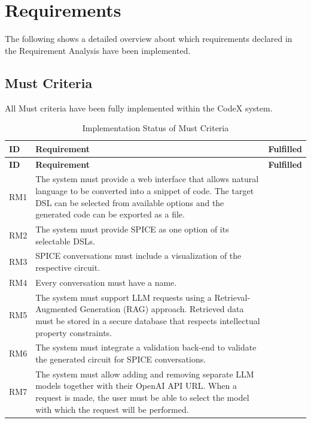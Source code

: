 \newcommand{\cmark}{\ding{51}}
\newcommand{\xmark}{\ding{55}}
\newcommand{\omark}{\ding{108}}
\chapter{Requirements}
The following shows a detailed overview about which requirements declared in the Requirement Analysis have been implemented.

\section{Must Criteria}
All Must criteria have been fully implemented within the CodeX system.

\begin{longtable}{p{1.2cm} p{11cm} p{1.5cm}}
\caption{Implementation Status of Must Criteria}
\label{tab:must-criteria} \\

\toprule
\textbf{ID} & \textbf{Requirement} & \textbf{Fulfilled} \\
\midrule
\endfirsthead

\toprule
\textbf{ID} & \textbf{Requirement} & \textbf{Fulfilled} \\
\midrule
\endhead

RM1 & The system must provide a web interface that allows natural language to be converted into a snippet of code. The target DSL can be selected from available options and the generated code can be exported as a file. & \cmark \\

RM2 & The system must provide SPICE as one option of its selectable DSLs. & \cmark \\

RM3 & SPICE conversations must include a visualization of the respective circuit. & \cmark \\

RM4 & Every conversation must have a name. & \cmark \\

RM5 & The system must support LLM requests using a Retrieval-Augmented Generation (RAG) approach. Retrieved data must be stored in a secure database that respects intellectual property constraints. & \cmark \\

RM6 & The system must integrate a validation back-end to validate the generated circuit for SPICE conversations. & \cmark \\

RM7 & The system must allow adding and removing separate LLM models together with their OpenAI API URL. When a request is made, the user must be able to select the model with which the request will be performed. & \cmark \\

\bottomrule
\end{longtable}

